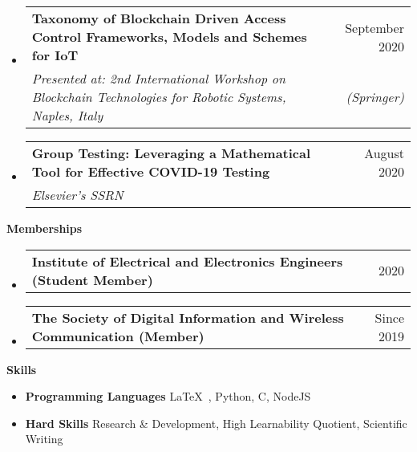 \documentclass[letterpaper,12pt]{article}[leftmargin=*]
\makeatletter
\def \entryspacing {-0pt}
\renewcommand{\section}[2]{\vspace{5pt}
  \colorbox{ternary}{\color{white}\raggedbottom\normalsize\textbf{{#1}{\hspace{7pt}#2}}}
}
\newcommand{\resumeEntryStart}{\begin{itemize}[leftmargin=2.5mm]}
\newcommand{\resumeEntryEnd}{\end{itemize}\vspace{\entryspacing}}
\newcommand{\resumeItemListStart}{\begin{itemize}[leftmargin=4.5mm]}
\newcommand{\resumeItemListEnd}{\end{itemize}}
\newcommand{\resumeItem}[1]{
  \item\small{
    {#1 \vspace{-2pt}}
  }
}
\newcommand{\resumeEntryTSDL}[4]{
  \vspace{-1pt}\item[]
    \begin{tabularx}{0.97\textwidth}{X@{\hspace{60pt}}r}
      \textbf{\color{primary}#1} & {\firabook\color{accent}\small#2} \\
      \textit{\color{accent}\small#3} & \textit{\color{accent}\small#4} \\
    \end{tabularx}\vspace{-6pt}
}
\newcommand{\resumeEntryTD}[2]{
  \vspace{-1pt}\item[]
    \begin{tabularx}{0.97\textwidth}{X@{\hspace{60pt}}r}
      \textbf{\color{primary}#1} & {\firabook\color{accent}\small#2} \\
    \end{tabularx}\vspace{-6pt}
}
\newcommand{\resumeEntryS}[2]{
  \item[]\small{
    \textbf{\color{primary}#1 }{ #2 \vspace{-6pt}}
  }
}
\makeatother
\begin{document}
\resumeEntryStart
    \resumeEntryTSDL
      {Taxonomy of Blockchain Driven Access Control Frameworks, Models and Schemes for IoT}{September 2020}
      {Presented at: 2nd International Workshop on Blockchain Technologies for Robotic Systems, Naples, Italy }{(Springer)}
\resumeEntryEnd
  
  \resumeEntryStart
    \resumeEntryTSDL
      {Group Testing: Leveraging a Mathematical Tool for Effective COVID-19 Testing}{August 2020}
      {Elsevier's SSRN}{}
\resumeEntryEnd






\section{\faTags}{Memberships}

  \resumeEntryStart
    \resumeEntryTD
      {Institute of Electrical and Electronics Engineers (Student Member)}{2020}
  \resumeEntryEnd

  \resumeEntryStart
    \resumeEntryTD
      {The Society of Digital Information and Wireless Communication (Member)}{Since 2019}
  \resumeEntryEnd

\section{\faGears}{Skills}
 \resumeEntryStart
  \resumeEntryS{Programming Languages } {\LaTeX\ , Python, C, NodeJS}
  \resumeEntryS{Hard Skills } {Research \& Development, High Learnability Quotient, Scientific Writing}
 \resumeEntryEnd
\end{document}
